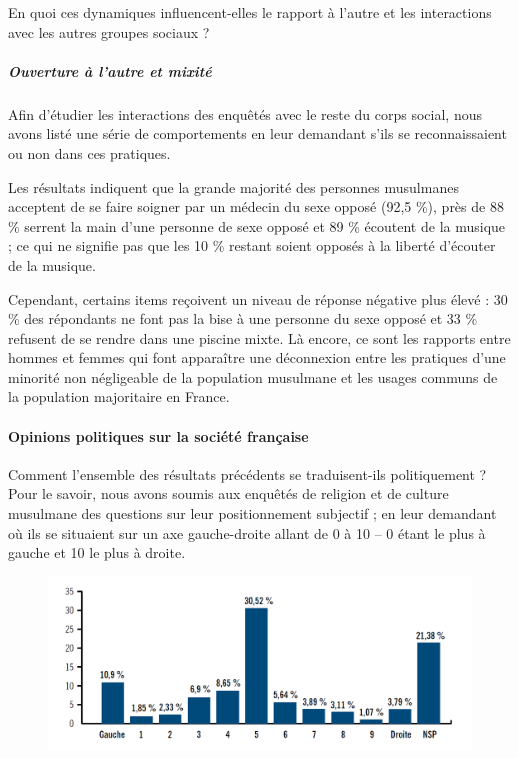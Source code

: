 En quoi ces dynamiques influencent-elles le rapport à l'autre et les
interactions avec les autres groupes sociaux ?


\subparagraph{Ouverture à l'autre et
mixité}


Afin d'étudier les interactions des enquêtés avec le reste du corps
social, nous avons listé une série de comportements en leur demandant
s'ils se reconnaissaient ou non dans ces pratiques.

Les résultats indiquent que la grande majorité des personnes musulmanes
acceptent de se faire soigner par un médecin du sexe opposé (92,5 \%),
près de 88 \% serrent la main d'une personne de sexe opposé et 89 \%
écoutent de la musique ; ce qui ne signifie pas que les 10 \% restant
soient opposés à la liberté d'écouter de la musique.

Cependant, certains items reçoivent un niveau de réponse négative plus
élevé : 30 \% des répondants ne font pas la bise à une personne du sexe
opposé et 33 \% refusent de se rendre dans une piscine mixte. Là encore,
ce sont les rapports entre hommes et femmes qui font apparaître une
déconnexion entre les pratiques d'une minorité non négligeable de la
population musulmane et les usages communs de la population majoritaire
en France.

\paragraph{Opinions politiques sur la société
française}


Comment l'ensemble des résultats précédents se traduisent-ils
politiquement ? Pour le savoir, nous avons soumis aux enquêtés de
religion et de culture musulmane des questions sur leur positionnement
subjectif ; en leur demandant où ils se situaient sur un axe
gauche-droite allant de 0 à 10 -- 0 étant le plus à gauche et 10 le plus
à droite.


\begin{figure}
    \centering
\includegraphics[width=\textwidth]{ImageIslamFrance/GaucheDroite.png}

  
\end{figure}


